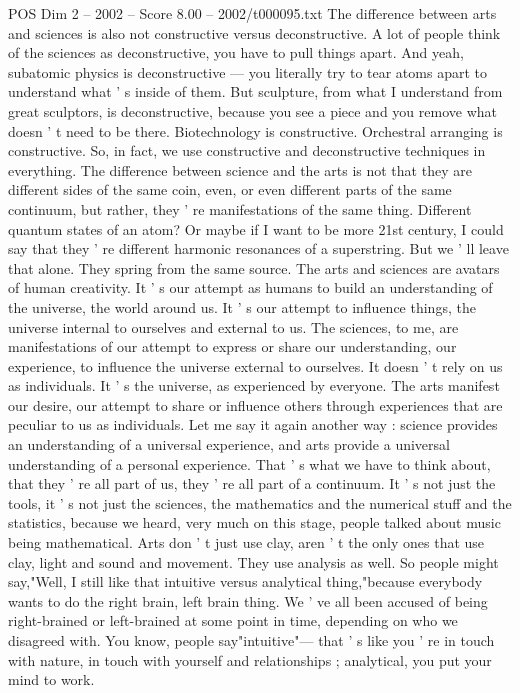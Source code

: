 \begin{textsample}{POS Dim 2 – 2002 – Score 8.00 – 2002/t000095.txt}
The difference between arts and sciences is also not constructive versus deconstructive.
A lot of people think of the sciences as deconstructive, you have to pull things apart.
And yeah, subatomic physics is deconstructive — you literally try to tear atoms apart to understand what ' s inside of them.
But sculpture, from what I understand from great sculptors, is deconstructive, because you see a piece and you remove what doesn ' t need to be there.
Biotechnology is constructive.
Orchestral arranging is constructive.
So, in fact, we use constructive and deconstructive techniques in everything.
The difference between science and the arts is not that they are different sides of the same coin, even, or even different parts of the same continuum, but rather, they ' re manifestations of the same thing.
Different quantum states of an atom?
Or maybe if I want to be more 21st century, I could say that they ' re different harmonic resonances of a superstring.
But we ' ll leave that alone.
They spring from the same source.
The arts and sciences are avatars of human creativity.
It ' s our attempt as humans to build an understanding of the universe, the world around us.
It ' s our attempt to influence things, the universe internal to ourselves and external to us.
The sciences, to me, are manifestations of our attempt to express or share our understanding, our experience, to influence the universe external to ourselves.
It doesn ' t rely on us as individuals.
It ' s the universe, as experienced by everyone.
The arts manifest our desire, our attempt to share or influence others through experiences that are peculiar to us as individuals.
Let me say it again another way : science provides an understanding of a universal experience, and arts provide a universal understanding of a personal experience.
That ' s what we have to think about, that they ' re all part of us, they ' re all part of a continuum.
It ' s not just the tools, it ' s not just the sciences, the mathematics and the numerical stuff and the statistics, because we heard, very much on this stage, people talked about music being mathematical.
Arts don ' t just use clay, aren ' t the only ones that use clay, light and sound and movement.
They use analysis as well.
So people might say,"Well, I still like that intuitive versus analytical thing,"because everybody wants to do the right brain, left brain thing.
We ' ve all been accused of being right-brained or left-brained at some point in time, depending on who we disagreed with.
You know, people say"intuitive"— that ' s like you ' re in touch with nature, in touch with yourself and relationships ; analytical, you put your mind to work.

\end{textsample}

